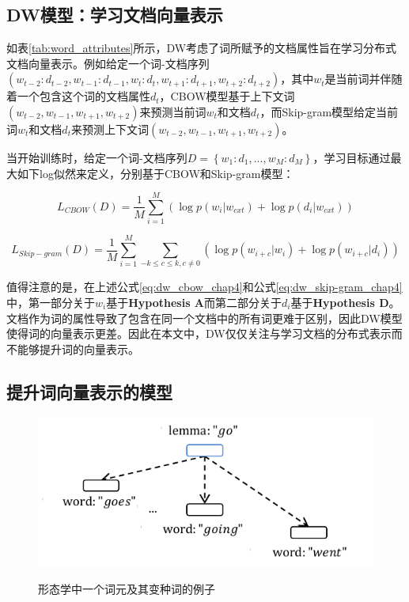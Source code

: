 \documentclass[master]{njuthesis}
\begin{document}
\subsection{DW模型：学习文档向量表示}\label{subsec_dw_chap4}

如表\ref{tab:word_attributes}所示，DW考虑了词所赋予的文档属性旨在学习分布式文档向量表示。例如给定一个词-文档序列$(w_{t-2}:d_{t-2}, w_{t-1}:d_{t-1}, w_t:d_t, w_{t+1}:d_{t+1}, w_{t+2}:d_{t+2})$，其中$w_t$是当前词并伴随着一个包含这个词的文档属性$d_t$，CBOW模型基于上下文词$(w_{t-2}, w_{t-1}, w_{t+1}, w_{t+2})$来预测当前词$w_t$和文档$d_t$，而Skip-gram模型给定当前词$w_t$和文档$d_t$来预测上下文词$(w_{t-2}, w_{t-1}, w_{t+1}, w_{t+2})$。

当开始训练时，给定一个词-文档序列$D=\left \{w_{1}:d_{1},...,w_{M}:d_{M}  \right \}$，学习目标通过最大如下log似然来定义，分别基于CBOW和Skip-gram模型：

	\begin{equation}\label{eq:dw_cbow_chap4}
	{L}_{CBOW}(D)=\frac{1}{M}\sum_{i=1}^{M}(\log p(w_{i}|w_{cxt})+\log p(d_{i}|w_{cxt}))
	\end{equation}
	
	\begin{equation}\label{eq:dw_skip-gram_chap4}
	{L}_{Skip-gram}(D)=\frac{1}{M}\sum_{i=1}^{M}\sum_{-k\leq c\leq k,c\neq 0}(\log p(w_{i+c}|w_{i})+\log p(w_{i+c}|d_{i}))
	\end{equation}

值得注意的是，在上述公式\ref{eq:dw_cbow_chap4}和公式\ref{eq:dw_skip-gram_chap4}中，第一部分关于$w_i$基于\textbf{Hypothesis A}而第二部分关于$d_i$基于\textbf{Hypothesis D}。文档作为词的属性导致了包含在同一个文档中的所有词更难于区别，因此DW模型使得词的向量表示更差。因此在本文中，DW仅仅关注与学习文档的分布式表示而不能够提升词的向量表示。

\subsection{提升词向量表示的模型}\label{subsec_improved_we_chap4}

\begin{figure}[htbp]
  \centering
  \includegraphics[width= 1.0\textwidth]{figures//lemma_word_chap4.pdf}\\
  \caption{形态学中一个词元及其变种词的例子}\label{fig:lemma_word_chap4}
\end{figure}
\end{document}
